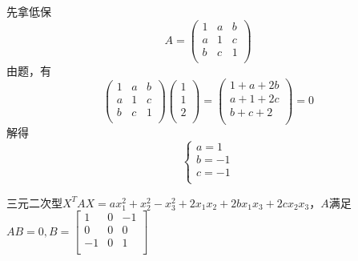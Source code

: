 \documentclass[lang=cn,10pt]{elegantbook}
\begin{document}
\begin{solution}
	
	先拿低保
		\begin{equation*}
		A=\left( \begin{matrix}
			1&		a&		b\\
			a&		1&		c\\
			b&		c&		1\\
		\end{matrix} \right) 
	\end{equation*}
	由题，有
	\begin{equation*}
		\left( \begin{matrix}
			1&		a&		b\\
			a&		1&		c\\
			b&		c&		1\\
		\end{matrix} \right)\left( \begin{array}{c}
		1\\
		1\\
		2\\
		\end{array} \right)=\left( \begin{array}{c}
		1+a+2b\\
		a+1+2c\\
		b+c+2\\
		\end{array} \right) =0
	\end{equation*}
	解得
	\begin{equation*}
		\begin{cases}
			a=1\\
			b=-1\\
			c=-1\\
		\end{cases}
	\end{equation*}
\end{solution}
\begin{example}
	三元二次型$X^{T}AX=ax_{1}^{2}+x_{2}^{2}-x_{3}^{2}+2x_{1}x_{2}+2bx_{1}x_{3}+2cx_{2}x_{3}$，$A$满足$ AB=0,B=\left[ \begin{matrix}
		1&		0&		-1\\
		0&		0&		0\\
		-1&		0&		1\\
	\end{matrix} \right] $
\end{example}
\end{document}
